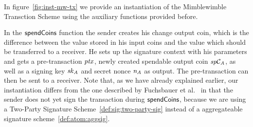 \begin{center}
    \fbox{
    \begin{varwidth}{\textwidth}
        \procedure[linenumbering]{$\procCreateCoin{\varValue}{\varBlindingFactor}$} {
        \varCommitment \opFunResult \procCommit{\varValue}{\varBlindingFactor} \\
        \varProof \opFunResult \procProof{\varCoin}{\varValue}{\varBlindingFactor} \\
        \pcreturn (\varCommitment, \varBlindingFactor, \varValue, \varProof)
        }
        \procedure[linenumbering]{$\procCreatePreTx{\varMsg}{\funArray{\varCoinInp}}{\funArray{\varCoinOut}}{\funArray{\varProof}}{\varSigContext}{\funArray{\varCommitment}}{\varSignature}{\varTime}$}{
        \pcreturn ( \pcskipln \\
        \varMsg \opAssign \varMsg, \pcskipln \\
        \varInputs \opAssign \funArray{\varCoinInp}, \pcskipln \\
        \varOutputs \opAssign \funArray{\varCoinOut}, \pcskipln \\
        \varProofs \opAssign \funArray{\varProof}, \pcskipln \\
        \varSigContext \opAssign \varSigContext, \pcskipln \\
        \varCommits \opAssign \funArray{\varCommitment}, \pcskipln \\
        \varSignature \opAssign \varSignature, \pcskipln \\
        \varTime \opAssign \varTime
        )
        }
    \end{varwidth}
    }
\end{center}

In figure~\cref{fig:inst-mw-tx} we provide an instantiation of the Mimblewimble Transction Scheme using the auxiliary functions provided before.

In the $\mathsf{spendCoins}$ function the sender creates his change output coin, which is the difference between the value stored in his input coins and the value which should be transferred to a receiver.
He sets up the signature context with his parameters and gets a pre-transaction $\mathit{ptx}$, newly created spendable output coin $\mathit{sp}\mathcal{C}_{\mathit{A}}$, as well as a signing key $\mathit{sk}_{\mathit{A}}$ and secret nonce $\mathit{\mathit{n}_{\mathit{A}}}$ as output.
The pre-transaction can then be sent to a receiver.
Note that, as we have already explained earlier, our instantiation differs from the one described by Fuchsbauer et al.~\cite{fuchsbauer2019aggregate} in that the sender does not yet sign the transaction during $\mathsf{spendCoins}$, because we are using a Two-Party Signature Scheme~\cref{def:sig:two-party-sig} instead of a aggregateable signature scheme~\cref{def:atom:aggsig}.

